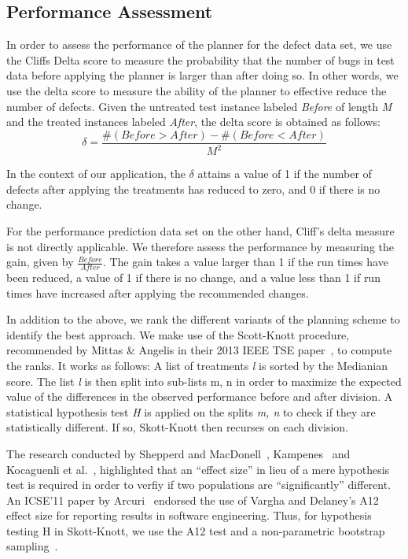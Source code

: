 \documentclass[conference]{IEEEtran}
\begin{document}
\subsection{Performance Assessment}

In order to assess the performance of the planner for the defect data set, we use the Cliffs Delta score to measure the probability that the number of bugs in test data before applying the planner is larger than after doing so. In other words, we use the delta score to measure the ability of the planner to effective reduce the number of defects. Given the untreated test instance labeled \textit{Before} of length \textit{M} and the treated instances labeled \textit{After}, the delta score is obtained as follows:
\begin{equation}
\delta = \frac{\#(Before>After) - \#(Before<After)}{M^2}
\end{equation}

In the context of our application, the $\delta$ attains a value of 1 if the number of defects after applying the treatments has reduced to zero, and 0 if there is no change.

For the performance prediction data set on the other hand, Cliff's delta measure is not directly applicable. We therefore assess the performance by measuring the gain, given by $\frac{Before}{After}$. The gain takes a value larger than 1 if the run times have been reduced, a value of 1 if there is no change, and a value less than 1 if run times have increased after applying the recommended changes. 

In addition to the above, we rank the different variants of the planning scheme to identify the best approach. We make use of the Scott-Knott procedure, recommended by Mittas \& Angelis in their 2013 IEEE TSE paper~\cite{sk}, to compute the ranks. It works as follows: A list of treatments \textit{l} is sorted by the Medianian score. The list \textit{l} is then split into sub-lists m, n in order to maximize the expected value of the differences in the observed performance before and after division. A statistical hypothesis test \textit{H} is applied on the splits \textit{m, n} to check if they are statistically different. If so, Skott-Knott then recurses on each division. 

The research conducted by Shepperd and MacDonell~\cite{}, Kampenes~\cite{} and Kocaguenli et al.~\cite{}, highlighted that an ``effect size'' in lieu of a mere hypothesis test is required in order to verfiy if two populations are ``significantly'' different. An ICSE'11 paper by Arcuri~\cite{} endorsed the use of Vargha and Delaney's A12 effect size for reporting results in software engineering. Thus, for hypothesis testing H in Skott-Knott, we use the A12 test and a non-parametric bootstrap sampling~\cite{}.
\end{document}
